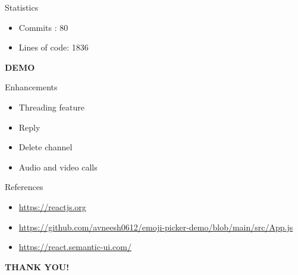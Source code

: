 \documentclass[14pt]{beamer}
\begin{document}
\begin{frame}{Statistics}
	\begin{itemize}
		\item Commits : 80
		\item Lines of code: 1836

	\end{itemize}
\end{frame}


\begin{frame}
\begin{center}
	\textbf{\huge DEMO}
\end{center}
\end{frame}

\begin{frame}{Enhancements}
	\begin{itemize}
		\item Threading feature
		\item Reply
		\item Delete channel
		\item Audio and video calls
	\end{itemize}
\end{frame}

\begin{frame}{References}
	\begin{itemize}
		\item \url {https://reactjs.org}
		\item \url {https://github.com/avneesh0612/emoji-picker-demo/blob/main/src/App.js}
		\item \url {https://react.semantic-ui.com/}
	\end{itemize}
\end{frame}

\begin{frame}
\begin{center}
	\textbf{\huge THANK YOU!}
\end{center}
\end{frame}
\end{document}
